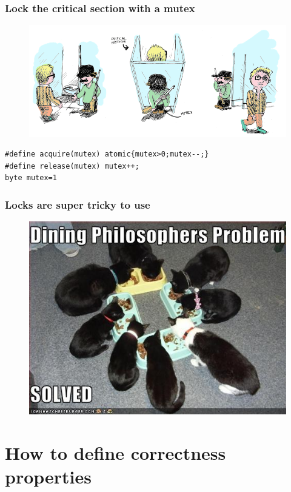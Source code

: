 \documentclass{beamer}
\begin{document}
\begin{frame}[fragile]
  \frametitle{Lock the critical section with a mutex}
  \begin{figure}
    \centering
    \includegraphics[scale=0.3]{mutex}
  \end{figure}
\begin{lstlisting}
#define acquire(mutex) atomic{mutex>0;mutex--;}
#define release(mutex) mutex++;
byte mutex=1
\end{lstlisting}

\end{frame}

\begin{frame}
  \frametitle{Locks are super tricky to use}
  \begin{figure}
    \centering
  \includegraphics[scale=0.7]{dpsolved}
  \end{figure}
\end{frame}

\section{How to define correctness properties}
\end{document}
